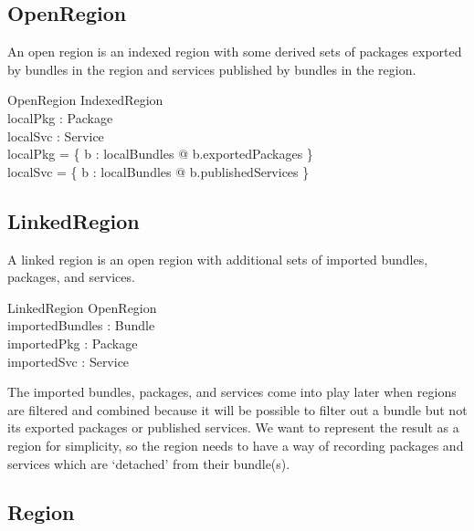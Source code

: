 \documentclass[a4paper,9pt]{article}
\begin{document}
\subsection{OpenRegion}

An open region is an indexed region with some derived sets of packages exported by bundles in the region
and services published by bundles in the region.

\begin{schema}{OpenRegion}
  IndexedRegion \\
  localPkg : \power Package \\
  localSvc : \power Service \\
\where
  localPkg = \bigcup \{ b : localBundles @ b.exportedPackages \} \\
  localSvc = \bigcup \{ b : localBundles @ b.publishedServices \} \\
\end{schema}

\subsection{LinkedRegion}

A linked region is an open region with additional sets of imported bundles, packages, and services.

\begin{schema}{LinkedRegion}
  OpenRegion \\
  importedBundles : \power Bundle \\
  importedPkg : \power Package \\
  importedSvc : \power Service \\  
\end{schema}
The imported bundles, packages, and services come into play later when regions are filtered and combined
because it will be possible to filter out a bundle but not its exported packages or published services.
We want to represent the result as a region for simplicity, so the region needs to have a way
of recording packages and services which are `detached' from their bundle(s).

\subsection{Region}
\end{document}
